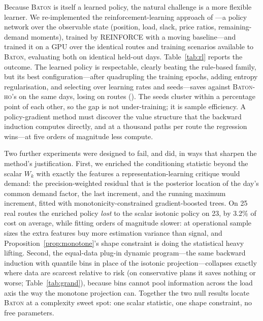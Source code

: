 \documentclass[preprint,authoryear,12pt]{elsarticle}
\theoremstyle{definition}
\theoremstyle{remark}
\begin{document}
Because \textsc{Baton} is itself a learned policy, the natural
challenge is a more flexible learner. We re-implemented the
reinforcement-learning approach of \citet{iklassov2024rl}---a policy
network over the observable state (position, load, slack, price ratios,
remaining-demand moments), trained by REINFORCE with a moving
baseline---and trained it on a GPU over the identical routes and
training scenarios available to \textsc{Baton}, evaluating both on
identical held-out days. Table~\ref{tab:rl} reports the outcome. The
learned policy is respectable, clearly beating the rule-based family,
but its best configuration---after quadrupling the training epochs,
adding entropy regularisation, and selecting over learning rates and
seeds---saves \rlBest{} against \textsc{Baton-ho}'s \rlBatonHo{} on the
same days, losing on \rlWinN{} routes (\rlWinP{}). The seeds cluster
within a percentage point of each other, so the gap is not
under-training; it is sample efficiency. A policy-gradient method must
discover the value structure that the backward induction computes
directly, and at a thousand paths per route the regression wins---at
five orders of magnitude less compute.



Two further experiments were designed to fail, and did, in ways that
sharpen the method's justification. First, we enriched the conditioning
statistic beyond the scalar $W_k$ with exactly the features a
representation-learning critique would demand: the precision-weighted
residual that is the posterior location of the day's common demand
factor, the last increment, and the running maximum increment, fitted
with monotonicity-constrained gradient-boosted trees. On 25 real routes
the enriched policy \emph{lost} to the scalar isotonic policy on 23,
by 3.2\% of cost on average, while fitting orders of magnitude slower:
at operational sample sizes the extra features buy more estimation
variance than signal, and Proposition~\ref{prop:monotone}'s shape
constraint is doing the statistical heavy lifting. Second, the
equal-data plug-in dynamic program---the same backward induction with
quantile bins in place of the isotonic projection---collapses exactly
where data are scarcest relative to risk (on conservative plans it
saves nothing or worse; Table~\ref{tab:grand}), because bins cannot
pool information across the load axis the way the monotone projection
can. Together the two null results locate \textsc{Baton} at a
complexity sweet spot: one scalar statistic, one shape constraint, no
free parameters.
\end{document}
